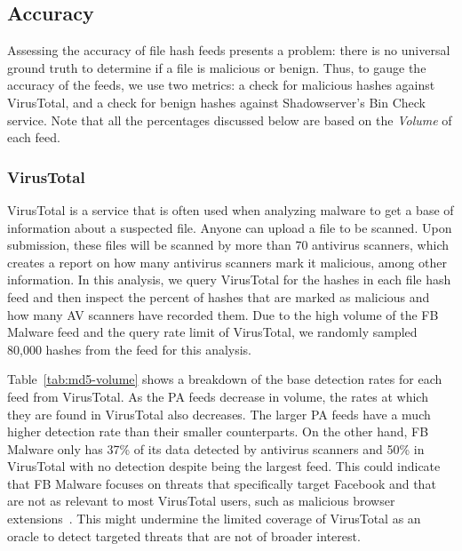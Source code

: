 \subsection{Accuracy}
\label{sec:hash-accuracy}
Assessing the accuracy of file hash feeds presents a problem: there is no
universal ground truth to determine if a file is malicious or benign. Thus,
to gauge the accuracy of the feeds, we use two metrics: a check for malicious
hashes against VirusTotal, and a check for benign hashes against Shadowserver's
Bin Check service. Note that all the percentages discussed below are based on
the \textit{Volume} of each feed.

\subsubsection{VirusTotal}

VirusTotal is a service that is often used when analyzing
malware to get a base of information about a suspected file.
Anyone can upload a file to be scanned. Upon submission, these files will be
scanned by more than 70 antivirus scanners, which creates a report on how many
antivirus scanners mark it malicious, among other information. In this analysis,
we query VirusTotal for the hashes in each file hash feed and then inspect the
percent of hashes that are marked as malicious and how many AV scanners have
recorded them. Due to the high volume of the FB Malware feed and the query
rate limit of VirusTotal, we randomly sampled 80,000 hashes from the feed for
this analysis.

Table~\ref{tab:md5-volume} shows a breakdown of the base detection rates for
each feed from VirusTotal. As the PA feeds decrease in volume, the rates at
which they are found in VirusTotal also decreases. The larger PA feeds have a
much higher detection rate than their smaller counterparts. On the other hand,
FB Malware only has 37\% of its data detected by antivirus scanners and 50\% in
VirusTotal with no detection despite being the largest feed. This could indicate
that FB Malware focuses on threats that specifically target Facebook and that
are not as relevant to most VirusTotal users, such as malicious browser
extensions~\cite{dekoven2017malicious, jagpal2015trends, kapravelos2014hulk}.
This might undermine the limited coverage of VirusTotal as an oracle to detect
targeted threats that are not of broader interest.

